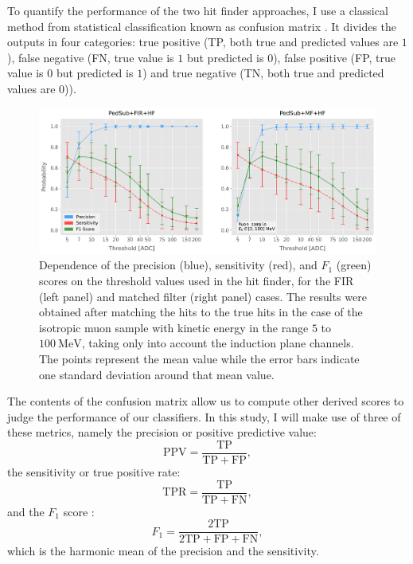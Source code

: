 To quantify the performance of the two hit finder approaches, I use a classical method from statistical classification known as confusion matrix \cite{Stehman1997}. It divides the outputs in four categories: true positive (TP, both true and predicted values are $1$), false negative (FN, true value is $1$ but predicted is $0$), false positive (FP, true value is $0$ but predicted is $1$) and true negative (TN, both true and predicted values are $0$)).

\begin{figure}[t]
	\centering
	\includegraphics[width=.99\linewidth]{Images/Matched_Filter/hit_study_muon_scores_indct}
	\caption[Dependence of the precision, sensitivity, and $F_{1}$ scores on the threshold values used in the hit finder for the FIR and matched filters.]{Dependence of the precision (blue), sensitivity (red), and $F_{1}$ (green) scores on the threshold values used in the hit finder, for the FIR (left panel) and matched filter (right panel) cases. The results were obtained after matching the hits to the true hits in the case of the isotropic muon sample with kinetic energy in the range $5$ to $100 \ \mathrm{MeV}$, taking only into account the induction plane channels. The points represent the mean value while the error bars indicate one standard deviation around that mean value.}
	\label{fig:threshold_opt}
\end{figure}

The contents of the confusion matrix allow us to compute other derived scores to judge the performance of our classifiers. In this study, I will make use of three of these metrics, namely the precision or positive predictive value:
\begin{equation}
	\mathrm{PPV} = \frac{\mathrm{TP}}{\mathrm{TP} + \mathrm{FP}},
\end{equation}
the sensitivity or true positive rate:
\begin{equation}
	\mathrm{TPR} = \frac{\mathrm{TP}}{\mathrm{TP} + \mathrm{FN}},
\end{equation}
and the $F_{1}$ score \cite{Taha2015}:
\begin{equation}
	F_{1} = \frac{\mathrm{2 TP}}{2\mathrm{TP} + \mathrm{FP} + \mathrm{FN}},
\end{equation}
which is the harmonic mean of the precision and the sensitivity.

